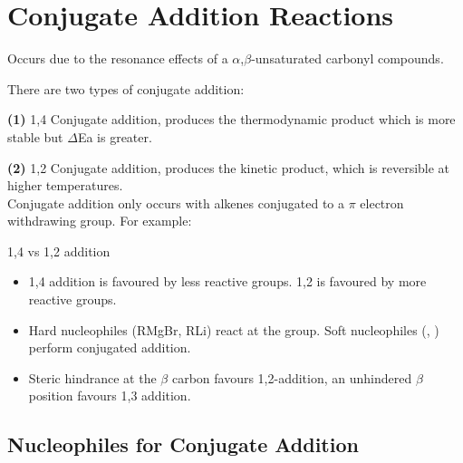 \section{Conjugate Addition Reactions}

Occurs due to the resonance effects of a $\alpha$,$\beta$-unsaturated carbonyl
compounds.


There are two types of conjugate addition:


\textbf{(1)} 1,4 Conjugate addition, produces the thermodynamic product which is
more stable but $\Delta$Ea is greater.

\textbf{(2)} 1,2 Conjugate addition, produces the kinetic product, which is
reversible at higher temperatures.\\

Conjugate addition only occurs with alkenes conjugated to a $\pi$ electron
withdrawing group. For example:


1,4 vs 1,2 addition
\begin{itemize}
  \item 1,4 addition is favoured by less reactive  groups. 1,2 is favoured
    by more reactive  groups.
  \item Hard nucleophiles (RMgBr, RLi) react at the  group. Soft nucleophiles
    (, ) perform conjugated addition.
  \item Steric hindrance at the $\beta$ carbon favours 1,2-addition, an unhindered
    $\beta$ position favours 1,3 addition.
\end{itemize}

\subsection{Nucleophiles for Conjugate Addition}

